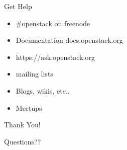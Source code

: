 \documentclass{beamer}
\begin{document}
\begin{frame}{Get Help}
\begin{itemize}
 \item \#openstack on freenode
 \item Documentation docs.openstack.org
 \item https://ask.openstack.org
 \item mailing lists
 \item Blogs, wikis, etc..
 \item Meetups
\end{itemize}
\end{frame}

\begin{frame}{Thank You!}
\begin{center}
Questions??
\end{center}
\end{frame}
\end{document}
